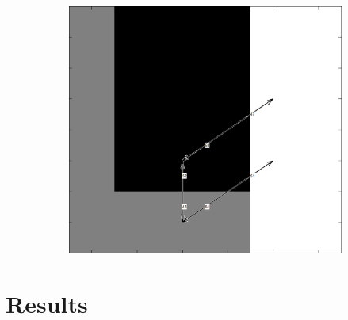 \documentclass[12pt]{article}
\newif\ifdebug
\newcommand{\todo}[1]{\ifdebug \textcolor{red}{\textit{\textbf{TODO:}} #1}\else \fi}    %
\begin{document}
\begin{figure}[tb]
\begin{subfigure}[b]{0.3\textwidth}
      \caption{}\label{fig:dart_simply3}
    \end{subfigure}
    ~
    \begin{subfigure}[b]{0.3\textwidth}
      \includegraphics[width=\textwidth]{img/simply1.jpg}
      \caption{}\label{fig:dart_simply1}
    \end{subfigure}
  \caption{\todo{caption}}\label{fig:dart_simply}
\end{figure}



\section{Results} %
\label{sec:results}




\end{document}
